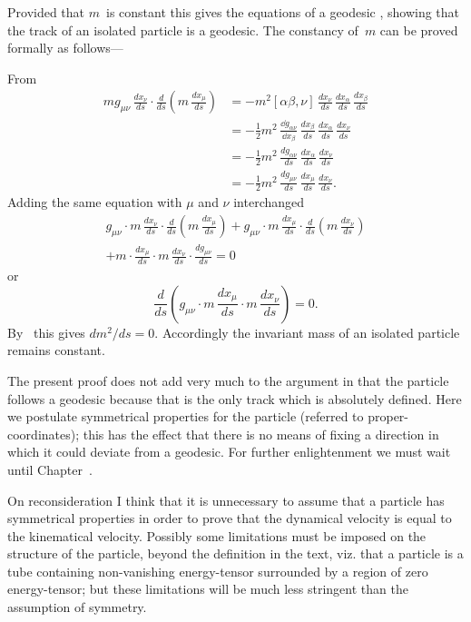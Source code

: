 \documentclass[12pt]{book}
\begin{document}
Provided that $m$~is constant this gives the equations of a geodesic ,
showing that the track of an isolated particle is a geodesic. The constancy of~$m$
can be proved formally as follows---

From~
\begin{align*}
  mg_{\mu\nu}\, \frac{dx_{\nu}}{ds} \cdot \frac{d}{ds} \left(m\, \frac{dx_{\mu}}{ds}\right)
  &= -m^{2} [\alpha\beta, \nu]\, \frac{dx_{\nu}}{ds}\, \frac{dx_{\alpha}}{ds}\, \frac{dx_{\beta}}{ds} \\
  &= -\tfrac{1}{2} m^{2} \, \frac{\dd g_{\alpha\nu}}{\dd x_{\beta}}\, \frac{dx_{\beta}}{ds}\, \frac{dx_{\alpha}}{ds}\, \frac{dx_{\nu}}{ds} \\
  &= -\tfrac{1}{2} m^{2} \, \frac{dg_{\alpha\nu}}{ds}\, \frac{dx_{\alpha}}{ds}\, \frac{dx_{\nu}}{ds} \\
  &= -\tfrac{1}{2} m^{2} \, \frac{dg_{\mu\nu}}{ds}\, \frac{dx_{\mu}}{ds}\, \frac{dx_{\nu}}{ds}.
\end{align*}
Adding the same equation with $\mu$ and $\nu$ interchanged
\begin{multline*}
g_{\mu\nu} \cdot m\, \frac{dx_{\nu}}{ds} \cdot \frac{d}{ds} \left(m\, \frac{dx_{\mu}}{ds}\right)
+ g_{\mu\nu} \cdot m\, \frac{dx_{\mu}}{ds} \cdot \frac{d}{ds} \left(m\, \frac{dx_{\nu}}{ds}\right) \\
+ m \cdot \frac{dx_{\mu}}{ds} \cdot m\, \frac{dx_{\nu}}{ds} \cdot \frac{dg_{\mu\nu}}{ds} = 0
\end{multline*}
or
\[
\frac{d}{ds} \left(g_{\mu\nu} \cdot m\, \frac{dx_{\mu}}{ds} \cdot m\, \frac{dx_{\nu}}{ds}\right) = 0.
\]
By~ this gives $dm^{2}/ds = 0$. Accordingly the invariant mass of an isolated
particle remains constant.

The present proof does not add very much to the argument in  that
the particle follows a geodesic because that is the only track which is absolutely
defined. Here we postulate symmetrical properties for the particle
(referred to proper-coordinates); this has the effect that there is no means of
fixing a direction in which it could deviate from a geodesic. For further
enlightenment we must wait until Chapter~\@.

On reconsideration I think that it is unnecessary to assume that a particle has symmetrical properties in order
to prove that the dynamical velocity is equal to the kinematical velocity.
Possibly some limitations must be imposed on the structure of the particle, beyond the definition in the text,
viz. that a particle is a tube containing non-vanishing energy-tensor surrounded by a region of zero energy-tensor;
but these limitations will be much less stringent than the assumption of symmetry.
\end{document}
